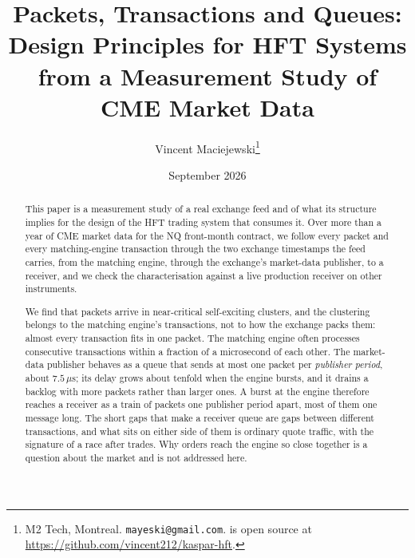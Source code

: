 \documentclass[11pt]{article}
\title{Packets, Transactions and Queues:\\
Design Principles for HFT Systems from a Measurement Study of CME Market Data}
\author{Vincent Maciejewski\thanks{M2 Tech, Montreal.
\texttt{mayeski@gmail.com}. \kasparhft{} is open source at
\url{https://github.com/vincent212/kaspar-hft}.}}
\date{September 2026}
\begin{document}
\maketitle

\begin{abstract}
This paper is a measurement study of a real exchange feed and of what its structure
implies for the design of the HFT trading system that consumes it. Over more than a year of CME
market data for the NQ front-month contract, we follow every packet and every
matching-engine transaction through the two exchange timestamps the feed carries, from
the matching engine, through the exchange's market-data publisher, to a receiver, and we
check the characterisation against a live production receiver on other instruments.

We find that packets arrive in near-critical self-exciting clusters, and
the clustering belongs to the matching engine's transactions, not to how the exchange
packs them: almost every transaction fits in one packet. The matching engine often
processes consecutive transactions within a fraction of a microsecond of each other. The
market-data publisher behaves as a queue that sends at most one packet per
\emph{publisher period}, about $7.5\,\mu\mathrm{s}$; its delay grows about tenfold when
the engine bursts, and it drains a backlog with more packets rather than larger ones. A burst at the engine therefore reaches a receiver as a train of packets one
publisher period apart, most of them one message long. The short gaps that make a
receiver queue are gaps between different transactions, and what sits on either side of
them is ordinary quote traffic, with the signature of a race after trades. Why orders
reach the engine so close together is a question about the market and is not addressed here.


\end{abstract}
\end{document}
